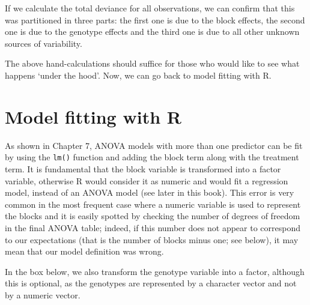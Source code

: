 \documentclass[a4paper,12pt,oneside]{book}
\newenvironment{Shaded}{\begin{snugshade}}{\end{snugshade}}
\newcommand{\DecValTok}[1]{#1}
\newcommand{\SpecialCharTok}[1]{#1}
\newcommand{\DocumentationTok}[1]{#1}
\newcommand{\OtherTok}[1]{#1}
\newcommand{\FunctionTok}[1]{#1}
\newcommand{\NormalTok}[1]{#1}
\begin{document}
If we calculate the total deviance for all observations, we can confirm that this was partitioned in three parts: the first one is due to the block effects, the second one is due to the genotype effects and the third one is due to all other unknown sources of variability.

\vspace{12pt}

\begin{Shaded}
\end{Shaded}

The above hand-calculations should suffice for those who would like to see what happens `under the hood'. Now, we can go back to model fitting with R.

\hypertarget{model-fitting-with-r}{%
\section{Model fitting with R}\label{model-fitting-with-r}}

As shown in Chapter 7, ANOVA models with more than one predictor can be fit by using the \texttt{lm()} function and adding the block term along with the treatment term. It is fundamental that the block variable is transformed into a factor variable, otherwise R would consider it as numeric and would fit a regression model, instead of an ANOVA model (see later in this book). This error is very common in the most frequent case where a numeric variable is used to represent the blocks and it is easily spotted by checking the number of degrees of freedom in the final ANOVA table; indeed, if this number does not appear to correspond to our expectations (that is the number of blocks minus one; see below), it may mean that our model definition was wrong.

In the box below, we also transform the genotype variable into a factor, although this is optional, as the genotypes are represented by a character vector and not by a numeric vector.

\vspace{12pt}
\end{document}
